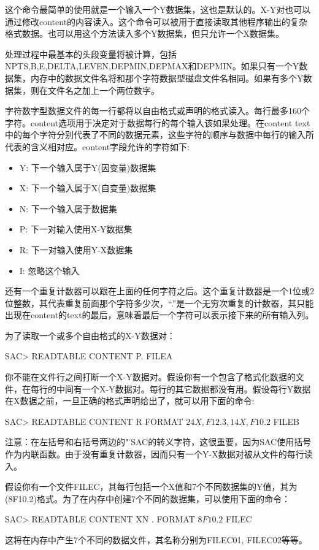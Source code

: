 这个命令最简单的使用就是一个输入一个Y数据集，这也是默认的。X-Y对也可以通过修改content的内容读入。这个命令可以被用于直接读取其他程序输出的复杂格式数据。也可以用这个方法读入多个Y数据集，但只允许一个X数据集。

处理过程中最基本的头段变量将被计算，包括NPTS,B,E,DELTA,LEVEN,DEPMIN,DEPMAX和DEPMIN。如果只有一个Y数据集，内存中的数据文件名将和那个字符数据型磁盘文件名相同。如果有多个Y数据集，则在文件名之加上一个两位数字。	

字符数字型数据文件的每一行都将以自由格式或声明的格式读入。每行最多160个字符。content选项用于决定对于数据每行的每个输入该如果处理。在content text中的每个字符分别代表了不同的数据元素，这些字符的顺序与数据中每行的输入所代表的含义相对应。content字段允许的字符如下:
\begin{itemize}
\item Y: 下一个输入属于Y(因变量)数据集
\item X: 下一个输入属于X(自变量)数据集
\item N: 下一个输入属于数据集
\item P: 下一对输入使用X-Y数据集
\item R: 下一对输入使用Y-X数据集
\item I: 忽略这个输入
\end{itemize}

还有一个重复计数器可以跟在上面的任何字符之后。这个重复计数器是一个1位或2位整数，其代表重复前面那个字符多少次，``.''是一个无穷次重复的计数器，其只能出现在content的text的最后，意味着最后一个字符可以表示接下来的所有输入列。

为了读取一个或多个自由格式的X-Y数据对：
\begin{SACCode}
SAC> READTABLE CONTENT P. FILEA
\end{SACCode}
你不能在文件行之间打断一个X-Y数据对。假设你有一个包含了格式化数据的文件，在每行的中间有一个X-Y数据对。每行的其它数据都没有用。假设每行Y数据在X数据之前，一旦正确的格式声明给出了，就可以用下面的命令:
\begin{SACCode}
SAC> READTABLE CONTENT R FORMAT \(24X,F12.3,14X,F10.2\) FILEB
\end{SACCode}
注意：在左括号和右括号两边的"\"是SAC的转义字符，这很重要，因为SAC使用括号作为内联函数。由于没有重复计数器，因而只有一个Y-X数据对被从文件的每行读入。

假设你有一个文件FILEC，其每行包括一个X值和7个不同数据集的Y值，其为(8F10.2)格式。为了在内存中创建7个不同的数据集，可以使用下面的命令：
\begin{SACCode}
SAC> READTABLE CONTENT XN . FORMAT \(8F10.2\) FILEC
\end{SACCode}
这将在内存中产生7个不同的数据文件，其名称分别为FILEC01, FILEC02等等。

